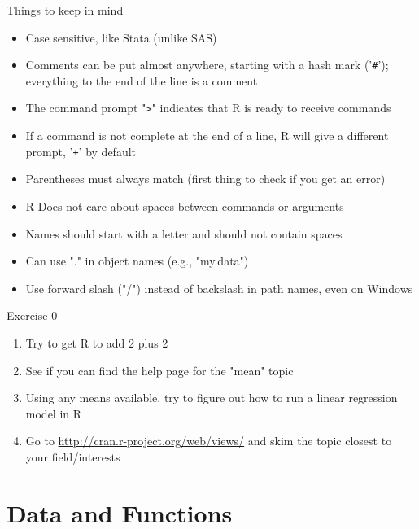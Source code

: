 \documentclass[table,smaller]{beamer}
\begin{document}
\begin{frame}[fragile,label=sec-2-8]{Things to keep in mind}
 \begin{itemize}
\item Case sensitive, like Stata (unlike SAS)

\item Comments can be put almost anywhere, starting with a hash mark ('\texttt{\#}'); everything to the end of the line is a comment

\item The command prompt "\texttt{>}" indicates that R is ready to receive commands

\item If a command is not complete at the end of a line, R will give a different prompt, '\texttt{+}' by default

\item Parentheses must always match (first thing to check if you get an error)

\item R Does not care about spaces between commands or arguments

\item Names should start with a letter and should not contain spaces

\item Can use "." in object names (e.g., "my.data")

\item Use forward slash ("/") instead of backslash in path names, even on Windows
\end{itemize}
\end{frame}

\begin{frame}[label=sec-2-9]{Exercise 0}
\begin{enumerate}
\item Try to get R to add 2 plus 2
\item See if you can find the help page for the "mean" topic
\item Using any means available, try to figure out how to run a linear regression model in R
\item Go to \url{http://cran.r-project.org/web/views/} and skim the topic closest to your field/interests
\end{enumerate}
\end{frame}


\section{Data and Functions}
\label{sec-3}
\end{document}
